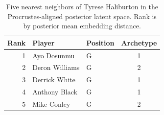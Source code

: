 \begin{table}[htbp]
  \centering\small
  \begin{tabular}{rllc}
    \toprule
    Rank & Player & Position & Archetype \\
    \midrule
    1 & Ayo Dosunmu & G & 1 \\
    2 & Deron Williams & G & 2 \\
    3 & Derrick White & G & 1 \\
    4 & Anthony Black & G & 1 \\
    5 & Mike Conley & G & 2 \\
    \bottomrule
  \end{tabular}
  \caption{Five nearest neighbors of Tyrese Haliburton in the Procrustes-aligned posterior latent space. Rank is by posterior mean embedding distance.}
  \label{tab:Tyrese_Haliburton_neighbors}
\end{table}

